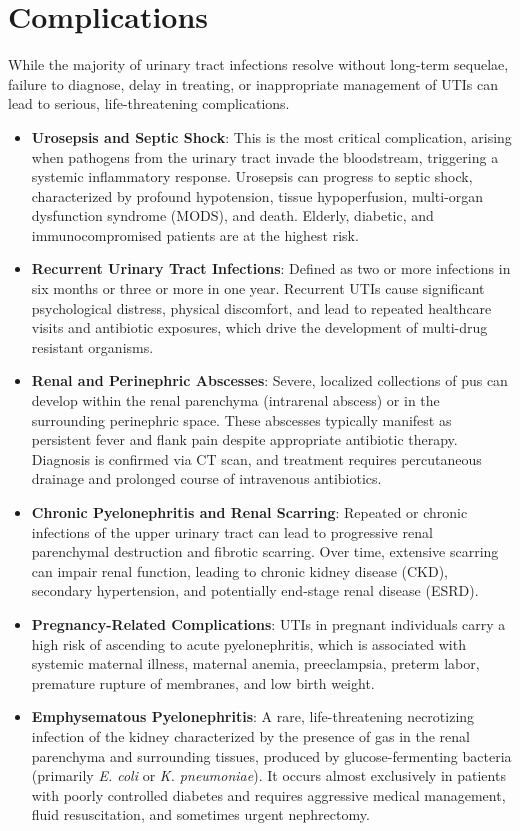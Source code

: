 \section*{Complications}
While the majority of urinary tract infections resolve without long-term sequelae, failure to diagnose, delay in treating, or inappropriate management of UTIs can lead to serious, life-threatening complications.

\begin{itemize}
    \item \textbf{Urosepsis and Septic Shock}: This is the most critical complication, arising when pathogens from the urinary tract invade the bloodstream, triggering a systemic inflammatory response. Urosepsis can progress to septic shock, characterized by profound hypotension, tissue hypoperfusion, multi-organ dysfunction syndrome (MODS), and death. Elderly, diabetic, and immunocompromised patients are at the highest risk.
    \item \textbf{Recurrent Urinary Tract Infections}: Defined as two or more infections in six months or three or more in one year. Recurrent UTIs cause significant psychological distress, physical discomfort, and lead to repeated healthcare visits and antibiotic exposures, which drive the development of multi-drug resistant organisms.
    \item \textbf{Renal and Perinephric Abscesses}: Severe, localized collections of pus can develop within the renal parenchyma (intrarenal abscess) or in the surrounding perinephric space. These abscesses typically manifest as persistent fever and flank pain despite appropriate antibiotic therapy. Diagnosis is confirmed via CT scan, and treatment requires percutaneous drainage and prolonged course of intravenous antibiotics.
    \item \textbf{Chronic Pyelonephritis and Renal Scarring}: Repeated or chronic infections of the upper urinary tract can lead to progressive renal parenchymal destruction and fibrotic scarring. Over time, extensive scarring can impair renal function, leading to chronic kidney disease (CKD), secondary hypertension, and potentially end-stage renal disease (ESRD).
    \item \textbf{Pregnancy-Related Complications}: UTIs in pregnant individuals carry a high risk of ascending to acute pyelonephritis, which is associated with systemic maternal illness, maternal anemia, preeclampsia, preterm labor, premature rupture of membranes, and low birth weight.
    \item \textbf{Emphysematous Pyelonephritis}: A rare, life-threatening necrotizing infection of the kidney characterized by the presence of gas in the renal parenchyma and surrounding tissues, produced by glucose-fermenting bacteria (primarily \textit{E. coli} or \textit{K. pneumoniae}). It occurs almost exclusively in patients with poorly controlled diabetes and requires aggressive medical management, fluid resuscitation, and sometimes urgent nephrectomy.

\end{itemize}
